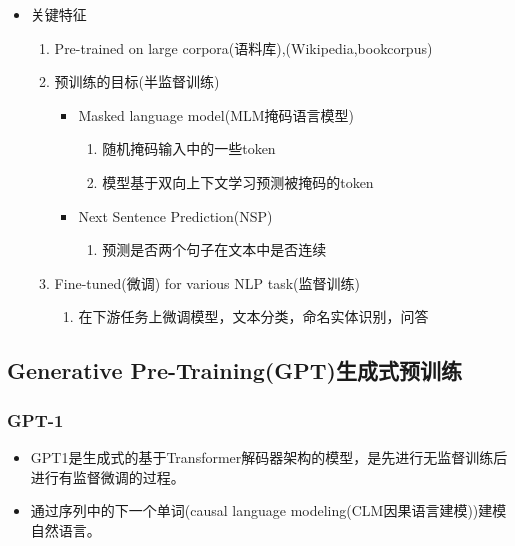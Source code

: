 \documentclass[UTF8]{ctexart}
\begin{document}
\begin{itemize}
    \item 关键特征
    \begin{enumerate}
        \item Pre-trained on large corpora(语料库),(Wikipedia,bookcorpus)
        \item 预训练的目标(半监督训练)
        \begin{itemize}
            \item Masked language model(MLM掩码语言模型)
            \begin{enumerate}
                \item 随机掩码输入中的一些token
                \item 模型基于双向上下文学习预测被掩码的token
            \end{enumerate}
            \item Next Sentence Prediction(NSP)
            \begin{enumerate}
                \item 预测是否两个句子在文本中是否连续
            \end{enumerate}
        \end{itemize}
        \item Fine-tuned(微调) for various NLP task(监督训练)
        \begin{enumerate}
            \item 在下游任务上微调模型，文本分类，命名实体识别，问答
        \end{enumerate}
    \end{enumerate}
\end{itemize}

\subsection{Generative Pre-Training(GPT)生成式预训练}
\subsubsection{GPT-1}
\begin{itemize}
    \item GPT1是生成式的基于Transformer解码器架构的模型，是先进行无监督训练后进行有监督微调的过程。
    \item 通过序列中的下一个单词(causal language modeling(CLM因果语言建模))建模自然语言。
\end{itemize}
\end{document}
